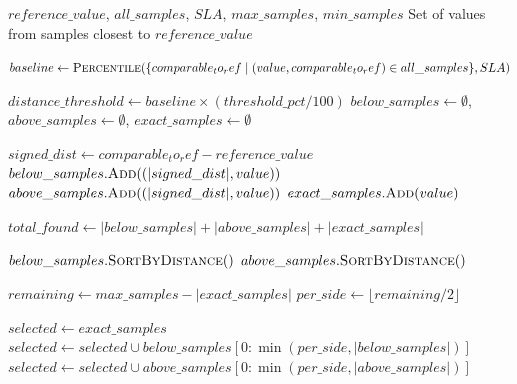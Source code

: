 \begin{algorithm}
    \caption{Select Relevant Samples for Predictions}
    \label{alg:select_related_samples_percentile}
    \small
    \begin{algorithmic}[1]
    \Require $reference\_value$, $all\_samples$, $SLA$, $max\_samples$, $min\_samples$
    \Ensure Set of values from samples closest to $reference\_value$
    
    \State {}
    \State $baseline \gets \textsc{Percentile}(\{comparable_to_ref \mid (value, comparable_to_ref) \in all\_samples\}, SLA)$
    
    \State {}
        \State $distance\_threshold \gets baseline \times (threshold\_pct / 100)$
        \State $below\_samples \gets \emptyset$, $above\_samples \gets \emptyset$, $exact\_samples \gets \emptyset$
        
        \State {}
            \State $signed\_dist \gets comparable_to_ref - reference\_value$
                    \State $below\_samples.\textsc{Add}((|signed\_dist|, value))$
                    \State $above\_samples.\textsc{Add}((|signed\_dist|, value))$
                \Else
                    \State $exact\_samples.\textsc{Add}(value)$
                \EndIf
            \EndIf
        \EndFor
        
        \State $total\_found \gets |below\_samples| + |above\_samples| + |exact\_samples|$
        
            \State {}
            \State $below\_samples.\textsc{SortByDistance}()$
            \State $above\_samples.\textsc{SortByDistance}()$
            
            \State $remaining \gets max\_samples - |exact\_samples|$
            \State $per\_side \gets \lfloor remaining / 2 \rfloor$
            
            \State {}
            \State $selected \gets exact\_samples$
            \State $selected \gets selected \cup below\_samples[0:\min(per\_side, |below\_samples|)]$
            \State $selected \gets selected \cup above\_samples[0:\min(per\_side, |above\_samples|)]$
            

\end{algorithmic}
\end{algorithm}
